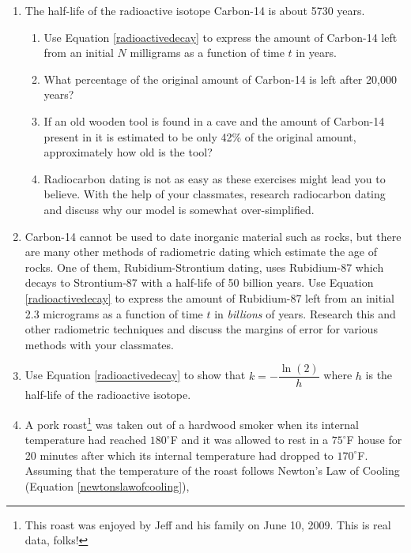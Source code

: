 \begin{enumerate}
\setcounter{enumi}{\value{HW}}


\item The half-life of the radioactive isotope Carbon-14 is about 5730 years.  

\begin{enumerate}

\item Use Equation \ref{radioactivedecay} to express the amount of Carbon-14 left from an initial $N$ milligrams as a function of time $t$ in years.

\item What percentage of the original amount of Carbon-14 is left after 20,000 years?

\item If an old wooden tool is found in a cave and the amount of Carbon-14 present in it is estimated to be only 42\% of the original amount, approximately how old is the tool?

\item Radiocarbon dating is not as easy as these exercises might lead you to believe.  With the help of your classmates, research radiocarbon dating and discuss why our model is somewhat over-simplified.  

\end{enumerate}

\item Carbon-14 cannot be used to date inorganic material such as rocks, but there are many other methods of radiometric dating which estimate the age of rocks.  One of them, Rubidium-Strontium dating, uses Rubidium-87 which decays to Strontium-87 with a half-life of 50 billion years.  Use Equation \ref{radioactivedecay} to express the amount of Rubidium-87 left from an initial 2.3 micrograms as a function of time $t$ in \emph{billions} of years.  Research this and other radiometric techniques and discuss the margins of error for various methods with your classmates.

\item Use Equation \ref{radioactivedecay} to show that $k = -\dfrac{\ln(2)}{h}$ where $h$ is the half-life of the radioactive isotope.


\item A pork roast\footnote{This roast was enjoyed by Jeff and his family on June 10, 2009.  This is real data, folks!} was taken out of a hardwood smoker when its internal temperature had reached $180^{\circ}$F and it was allowed to rest in a $75^{\circ}$F house for 20 minutes after which its internal temperature had dropped to $170^{\circ}$F. Assuming that the temperature of the roast follows Newton's Law of Cooling (Equation \ref{newtonslawofcooling}),


\end{enumerate}
